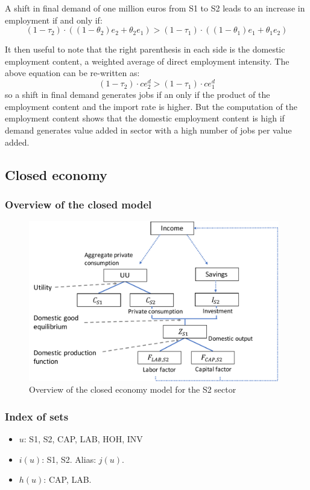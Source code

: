 A shift in final demand of one million euros from S1 to S2 leads to an increase in employment if and only if:
$$(1-\tau_2) \cdot \left( (1-\theta_2) e_2+ \theta_2 e_1 \right) > (1-\tau_1) \cdot \left( (1-\theta_1) e_1+ \theta_1 e_2 \right)$$

It then useful to note that the right parenthesis in each side is the domestic employment content, a weighted average of direct employment intensity. The above equation can be re-written as:
$$(1-\tau_2) \cdot ce^d_2> (1-\tau_1) \cdot ce^d_1 $$
so a shift in final demand generates jobs if an only if the product of the employment content and the import rate is higher.
But the computation of the employment content shows that the domestic employment content is high if demand generates value added in sector with a high number of jobs per value added.

\clearpage

\subsection{Closed economy}
\label{app:closed_economy}

\subsubsection{Overview of the closed model}
\begin{figure}[!h]
	\centering
	\includegraphics[height=7cm]{figures/overview_closed.pdf}
	\caption{Overview of the closed economy model for the S2 sector}
	\label{fig:overview_closed}
\end{figure}

\subsubsection{Index of sets}
\begin{itemize}
	\item $u$: S1, S2, CAP, LAB, HOH, INV
	\item $i(u)$: S1, S2. Alias: $j(u)$.
	\item $h(u)$: CAP, LAB.
\end{itemize}

